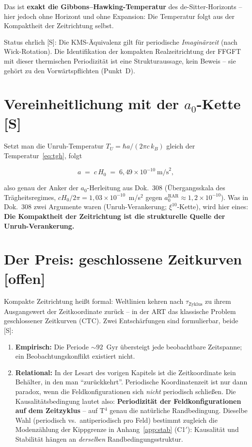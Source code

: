 Das ist \textbf{exakt die Gibbons--Hawking-Temperatur} des
de-Sitter-Horizonts -- hier jedoch ohne Horizont und ohne Expansion:
Die Temperatur folgt aus der Kompaktheit der Zeitrichtung selbst.

Status ehrlich [S]: Die KMS-Äquivalenz gilt für periodische
\emph{Imaginärzeit} (nach Wick-Rotation). Die Identifikation der
kompakten Realzeitrichtung der FFGFT mit dieser thermischen
Periodizität ist eine Strukturaussage, kein Beweis -- sie gehört zu
den Vorwärtspflichten (Punkt~D).

\section{Vereinheitlichung mit der $a_0$-Kette [S]}

Setzt man die Unruh-Temperatur $T_U = \hbar a/(2\pi c\,k_B)$ gleich
der Temperatur~\eqref{eq:tgh}, folgt

\begin{equation}
  a \;=\; c\,H_0 \;=\; 6{,}49\times10^{-10}~\text{m/s}^2,
\end{equation}

also genau der Anker der $a_0$-Herleitung aus Dok.~308
(Übergangsskala des Trägheitsregimes, $cH_0/2\pi
= 1{,}03\times10^{-10}$~m/s$^2$ gegen
$a_0^\text{RAR} \approx 1{,}2\times10^{-10}$). Was in Dok.~308 zwei
Argumente waren (Unruh-Verankerung; $\xi^{10}$-Kette), wird hier
eines: \textbf{Die Kompaktheit der Zeitrichtung ist die strukturelle
Quelle der Unruh-Verankerung.}

\section{Der Preis: geschlossene Zeitkurven [offen]}

Kompakte Zeitrichtung heißt formal: Weltlinien kehren nach
$\tau_\text{Zyklus}$ zu ihrem Ausgangswert der Zeitkoordinate
zurück -- in der ART das klassische Problem geschlossener Zeitkurven
(CTC). Zwei Entschärfungen sind formulierbar, beide [S]:

\begin{enumerate}
  \item \textbf{Empirisch:} Die Periode $\sim 92$~Gyr übersteigt
        jede beobachtbare Zeitspanne; ein Beobachtungskonflikt
        existiert nicht.
  \item \textbf{Relational:} In der Lesart des vorigen Kapitels ist
        die Zeitkoordinate kein Behälter, in den man
        \enquote{zurückkehrt}. Periodische Koordinatenzeit ist nur
        dann paradox, wenn die Feldkonfigurationen sich \emph{nicht}
        periodisch schließen. Die Kausalitätsbedingung lautet also:
        \textbf{Periodizität der Feldkonfigurationen auf dem
        Zeitzyklus} -- auf T$^4$ genau die natürliche Randbedingung.
        Dieselbe Wahl (periodisch vs.\ antiperiodisch pro Feld)
        bestimmt zugleich die Modenzählung der Kippgrenze in
        Anhang~\ref{app:stab} (C1$'$): Kausalität und Stabilität hängen an
        \emph{derselben} Randbedingungsstruktur.
\end{enumerate}

